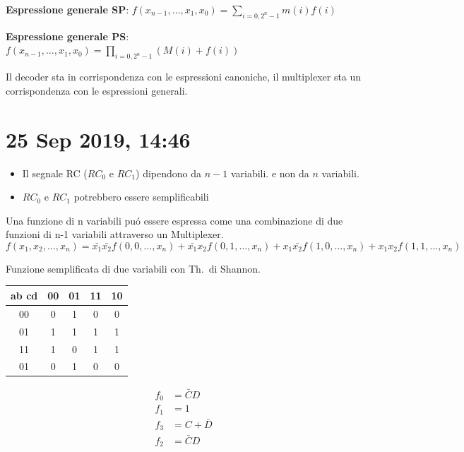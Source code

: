 \documentclass{article}
\begin{document}
\textbf{Espressione generale SP}: $f(x_{n-1}, \ldots, x_1, x_0) = \sum_{i=0, 2^n -1} m(i) f(i)$

\textbf{Espressione generale PS}: $f(x_{n-1}, \ldots, x_1, x_0) = \prod_{i=0, 2^n -1} (M(i) +f(i))$

Il decoder sta in corrispondenza con le espressioni canoniche, il multiplexer sta un corrispondenza con le espressioni generali.


\section{25 Sep 2019, 14:46}



\begin{itemize}
    \item{Il segnale RC ($RC_0$ e $RC_1$) dipendono da $n-1$ variabili. e non da $n$ variabili.}
    \item{$RC_0$ e $RC_1$ potrebbero essere semplificabili}
\end{itemize}

Una funzione di n variabili pu\'o essere espressa come una combinazione di due funzioni di n-1 variabili attraverso un Multiplexer.
\[f(x_1, x_2, \ldots, x_n) = \bar{x_1}\bar{x_2} f(0, 0, \ldots, x_n) + \bar{x_1} x_2 f(0, 1, \ldots, x_n) + x_1 \bar{x_2} f(1, 0, \ldots, x_n) + x_1 x_2 f(1, 1, \ldots, x_n)\]

Funzione semplificata di due variabili con Th.\ di Shannon.


\begin{minipage}{0.4\textwidth}
\begin{center}
\begin{tabular}{c|c|c|c|c|}
     ab cd & 00 & 01 & 11 & 10\\
     \hline
     00 &  0 & 1 & 0 & 0\\
     \hline
     01 & 1 & 1 & 1 & 1\\
     \hline
     11 & 1 & 0 & 1 & 1\\
     \hline
     01 & 0 & 1 & 0 & 0\\
     \hline
\end{tabular}
\end{center}
\end{minipage}
\begin{minipage}{0.4\textwidth}
\[
    \begin{split}
        f_0 &= \bar{C} D\\
        f_1 &= 1\\
        f_3 &= C + \bar{D}\\
        f_2 &= \bar{C} D
    \end{split}
\]
\end{minipage}
\end{document}
